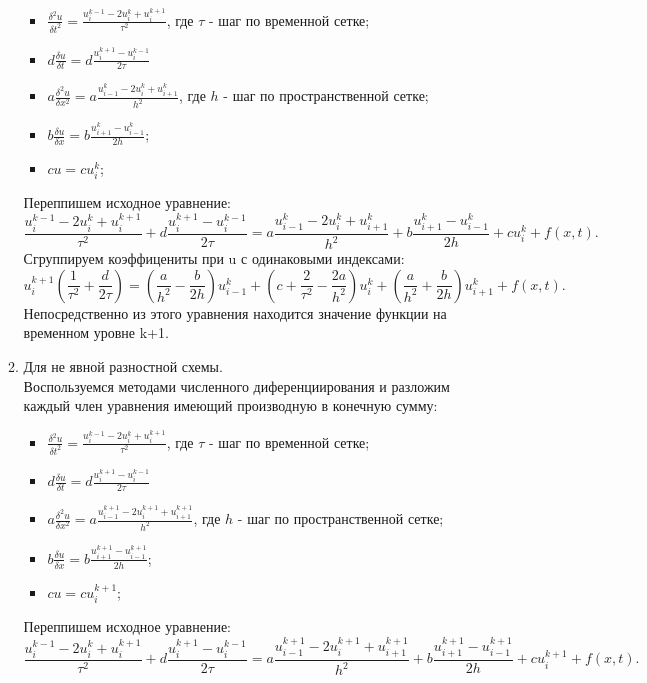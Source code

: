 \documentclass[12pt]{article}
\begin{document}
\begin{enumerate}
\begin{enumerate}
        \begin{itemize}
            \item $\frac{\delta^2 u}{\delta t^2} = \frac{u_{i}^{k-1}-2u_{i}^k+u_{i}^{k+1}}{\tau^2}$, где  $\tau$ - шаг по временной сетке;
            \item $d\frac{\delta u}{\delta t}=d\frac{u_i^{k+1}-u_i^{k-1}}{2\tau}$
            \item $a\frac{\delta^2 u}{\delta x^2} = a\frac{u_{i-1}^k-2u_{i}^k+u_{i+1}^k}{h^2}$, где  $h$ - шаг по пространственной сетке;
            \item $b\frac{\delta u}{\delta x} = b\frac{u_{i+1}^k-u_{i-1}^k}{2h}$;
            \item $cu = cu_{i}^k$;
        \end{itemize}
        Переппишем исходное уравнение:
        $$\frac{u_{i}^{k-1}-2u_{i}^k+u_{i}^{k+1}}{\tau^2}+d\frac{u_i^{k+1}-u_i^{k-1}}{2\tau} =a\frac{u_{i-1}^k-
        2u_{i}^k+u_{i+1}^k}{h^2}+b\frac{u_{i+1}^k-u_{i-1}^k}{2h}+cu_{i}^k+f(x,t).$$
        Сгруппируем коэффицениты при u с одинаковыми индексами:
        $$u_i^{k+1}\left(\frac{1}{\tau^2}+\frac{d}{2\tau}\right) = \left(\frac{a}{h^2}-\frac{b}{2h} \right)u_{i-1}^k + \left(c+\frac{2}{\tau^2}-\frac{2a}{h^2}\right)u_i^k +
        \left(\frac{a}{h^2}+\frac{b}{2h}\right)u_{i+1}^k +f(x,t).$$
        Непосредственно из этого уравнения находится значение функции на временном уровне k+1.
    \item Для не явной разностной схемы.
        \\Воспользуемся методами численного диференциирования и разложим каждый член уравнения имеющий производную в конечную сумму:
        \begin{itemize}
            \item $\frac{\delta^2 u}{\delta t^2} = \frac{u_{i}^{k-1}-2u_{i}^k+u_{i}^{k+1}}{\tau^2}$, где  $\tau$ - шаг по временной сетке;
            \item $d\frac{\delta u}{\delta t}=d\frac{u_i^{k+1}-u_i^{k-1}}{2\tau}$
            \item $a\frac{\delta^2 u}{\delta x^2} = a\frac{u_{i-1}^{k+1}-2u_{i}^{k+1}+u_{i+1}^{k+1}}{h^2}$, где  $h$ - шаг по пространственной сетке;
            \item $b\frac{\delta u}{\delta x} = b\frac{u_{i+1}^{k+1}-u_{i-1}^{k+1}}{2h}$;
            \item $cu = cu_{i}^{k+1}$;
        \end{itemize}
        Переппишем исходное уравнение:
        $$\frac{u_{i}^{k-1}-2u_{i}^k+u_{i}^{k+1}}{\tau^2}+d\frac{u_i^{k+1}-u_i^{k-1}}{2\tau} =a\frac{u_{i-1}^{k+1}-2u_{i}^{k+1}+u_{i+1}^{k+1}}{h^2}+b\frac{u_{i+1}^{k+1}-u_{i-1}^{k+1}}{2h}+cu_{i}^{k+1}+f(x,t).$$

\end{enumerate}
\end{enumerate}
\end{document}
